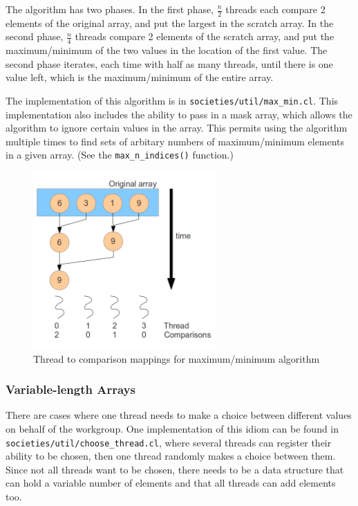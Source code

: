 \documentclass{article}
\begin{document}
The algorithm has two phases. In the first phase, $\frac{n}{2}$ threads each compare 2 elements of the original array, and put the largest in the scratch array. In the second phase, $\frac{n}{4}$ threads compare 2 elements of the scratch array, and put the maximum/minimum of the two values in the location of the first value. The second phase iterates, each time with half as many threads, until there is one value left, which is the maximum/minimum of the entire array.

The implementation of this algorithm is in \texttt{societies/util/max\_min.cl}. This implementation also includes the ability to pass in a mask array, which allows the algorithm to ignore certain values in the array. This permits using the algorithm multiple times to find sets of arbitary numbers of maximum/minimum elements in a given array. (See the \texttt{max\_n\_indices()} function.)

\begin{figure}[ht!]
\centering
\includegraphics[width=70mm]{tree-maximum.png}
\caption{Thread to comparison mappings for maximum/minimum algorithm}
\label{fig:treemaximum}
\end{figure}

\subsubsection{Variable-length Arrays}
There are cases where one thread needs to make a choice between different values on behalf of the workgroup. One implementation of this idiom can be found in \texttt{societies/util/choose\_thread.cl}, where several threads can register their ability to be chosen, then one thread randomly makes a choice between them. Since not all threads want to be chosen, there needs to be a data structure that can hold a variable number of elements and that all threads can add elements too.
\end{document}

